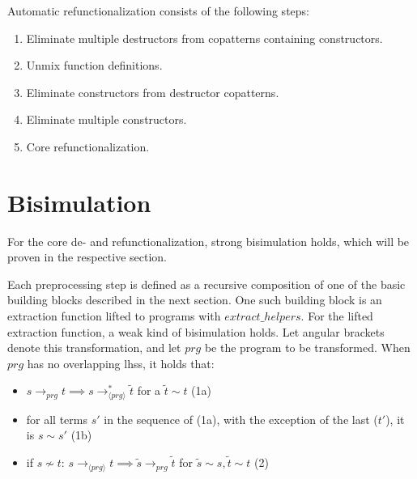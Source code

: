 Automatic refunctionalization consists of the following steps:
\begin{enumerate}
\item Eliminate multiple destructors from copatterns containing constructors.

\item Unmix function definitions.

\item Eliminate constructors from destructor copatterns.

\item Eliminate multiple constructors.

\item Core refunctionalization.

\end{enumerate}

\section{Bisimulation}

For the core de- and refunctionalization, strong bisimulation holds, which will be proven in the respective section.

Each preprocessing step is defined as a recursive composition of one of the basic building blocks described in the next section. One such building block is an extraction function lifted to programs with $extract\_helpers$. For the lifted extraction function, a weak kind of bisimulation holds. Let angular brackets denote this transformation, and let $prg$ be the program to be transformed. When $prg$ has no overlapping lhss, it holds that:

\begin{itemize}
\item $s \longrightarrow_{prg} t \implies s  \longrightarrow^*_{\langle prg \rangle} \tilde{t}$ for a $\tilde{t} \sim t$ (1a)

\item for all terms $s'$ in the sequence of (1a), with the exception of the last ($t'$), it is $s \sim s'$ (1b)

\item if $s \not\sim t$: $s \longrightarrow_{\langle prg \rangle} t \implies \tilde{s} \longrightarrow_{prg} \tilde{t}$ for $\tilde{s} \sim s, \tilde{t} \sim t$ (2)

\end{itemize}

